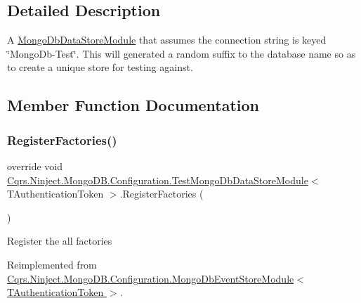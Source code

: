 \subsection{Detailed Description}
A \hyperlink{classCqrs_1_1Ninject_1_1MongoDB_1_1Configuration_1_1MongoDbDataStoreModule}{Mongo\+Db\+Data\+Store\+Module} that assumes the connection string is keyed \char`\"{}\+Mongo\+Db-\/\+Test\char`\"{}. This will generated a random suffix to the database name so as to create a unique store for testing against. 



\subsection{Member Function Documentation}
\mbox{\label{classCqrs_1_1Ninject_1_1MongoDB_1_1Configuration_1_1TestMongoDbDataStoreModule_abff300412dc5c2602db5f51925204c6e_abff300412dc5c2602db5f51925204c6e}} 
\subsubsection{\texorpdfstring{Register\+Factories()}{RegisterFactories()}}
{\footnotesize\ttfamily override void \hyperlink{classCqrs_1_1Ninject_1_1MongoDB_1_1Configuration_1_1TestMongoDbDataStoreModule}{Cqrs.\+Ninject.\+Mongo\+D\+B.\+Configuration.\+Test\+Mongo\+Db\+Data\+Store\+Module}$<$ T\+Authentication\+Token $>$.Register\+Factories (\begin{DoxyParamCaption}{ }\end{DoxyParamCaption})\hspace{0.3cm}{\ttfamily [virtual]}}



Register the all factories 



Reimplemented from \hyperlink{classCqrs_1_1Ninject_1_1MongoDB_1_1Configuration_1_1MongoDbEventStoreModule_a32cbf7060777484eb68c4dc032109e6c_a32cbf7060777484eb68c4dc032109e6c}{Cqrs.\+Ninject.\+Mongo\+D\+B.\+Configuration.\+Mongo\+Db\+Event\+Store\+Module$<$ T\+Authentication\+Token $>$}.

